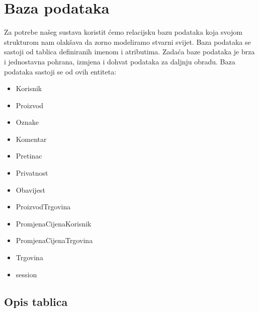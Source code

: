 				
		\section{Baza podataka}
			
			
		Za potrebe našeg sustava koristit ćemo relacijsku bazu podataka koja svojom strukturom nam olakšava da zorno modeliramo stvarni svijet. Baza podataka se sastoji od tablica definiranih imenom i  atributima. Zadaća baze podataka je brza i jednostavna pohrana, izmjena i dohvat podataka za daljnju obradu. Baza podataka sastoji se od ovih entiteta: 
		\begin{itemize}
		\item Korisnik
\item Proizvod
\item Oznake
\item Komentar
\item Pretinac
\item Privatnost
\item Obavijest
\item ProizvodTrgovina
\item PromjenaCijenaKorisnik
\item PromjenaCijenaTrgovina
\item Trgovina
\item session
		\end{itemize}

		
			\subsection{Opis tablica}
			

				
				
				
